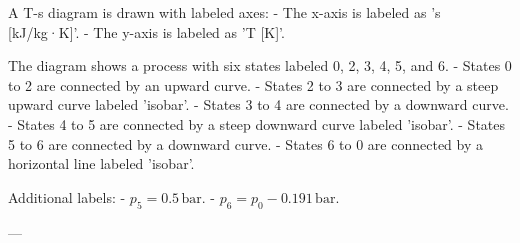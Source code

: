 A T-s diagram is drawn with labeled axes:  
- The x-axis is labeled as 's [kJ/kg·K]'.  
- The y-axis is labeled as 'T [K]'.  

The diagram shows a process with six states labeled 0, 2, 3, 4, 5, and 6.  
- States 0 to 2 are connected by an upward curve.  
- States 2 to 3 are connected by a steep upward curve labeled 'isobar'.  
- States 3 to 4 are connected by a downward curve.  
- States 4 to 5 are connected by a steep downward curve labeled 'isobar'.  
- States 5 to 6 are connected by a downward curve.  
- States 6 to 0 are connected by a horizontal line labeled 'isobar'.  

Additional labels:  
- \( p_5 = 0.5 \, \text{bar} \).  
- \( p_6 = p_0 - 0.191 \, \text{bar} \).  

---